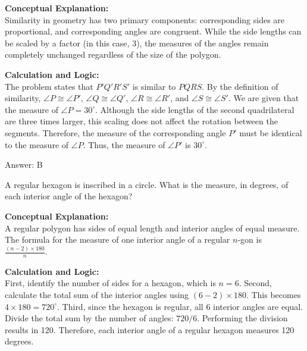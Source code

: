 \documentclass[11pt,paper=a4,answers]{exam}
\begin{document}
\begin{questions}
\begin{solution}
\textbf{Conceptual Explanation:} \\
Similarity in geometry has two primary components: corresponding sides are proportional, and corresponding angles are congruent. While the side lengths can be scaled by a factor (in this case, 3), the measures of the angles remain completely unchanged regardless of the size of the polygon.

\vspace{30pt}

\textbf{Calculation and Logic:} \\
The problem states that $P'Q'R'S'$ is similar to $PQRS$. By the definition of similarity, $\angle P \cong \angle P'$, $\angle Q \cong \angle Q'$, $\angle R \cong \angle R'$, and $\angle S \cong \angle S'$. We are given that the measure of $\angle P = 30^\circ$. Although the side lengths of the second quadrilateral are three times larger, this scaling does not affect the rotation between the segments. Therefore, the measure of the corresponding angle $P'$ must be identical to the measure of $\angle P$. Thus, the measure of $\angle P'$ is $30^\circ$.

\vspace{30pt}

Answer: \colorbox{yellow!100}{B}
\end{solution}

\vspace{60pt}

\question
A regular hexagon is inscribed in a circle. What is the measure, in degrees, of each interior angle of the hexagon?

\begin{solution}
\textbf{Conceptual Explanation:} \\
A regular polygon has sides of equal length and interior angles of equal measure. The formula for the measure of one interior angle of a regular $n$-gon is $\frac{(n - 2) \times 180}{n}$.

\vspace{30pt}

\textbf{Calculation and Logic:} \\
First, identify the number of sides for a hexagon, which is $n = 6$. Second, calculate the total sum of the interior angles using $(6 - 2) \times 180$. This becomes $4 \times 180 = 720^\circ$. Third, since the hexagon is regular, all 6 interior angles are equal. Divide the total sum by the number of angles: $720 / 6$. Performing the division results in 120. Therefore, each interior angle of a regular hexagon measures 120 degrees.


\end{solution}
\end{questions}
\end{document}
